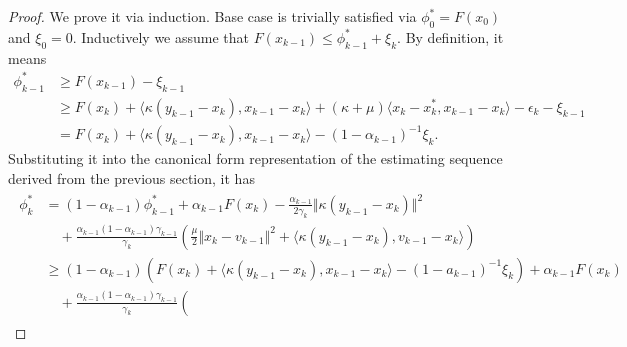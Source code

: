 \documentclass[12pt]{article}
\begin{document}
        \begin{proof}
            We prove it via induction. 
            Base case is trivially satisfied via $\phi_0^* = F(x_0)$ and $\xi_0 = 0$. 
            Inductively we assume that $F(x_{k - 1}) \le \phi_{k - 1}^* + \xi_k$. 
            By definition, it means 
            \begin{align}
                \phi_{k - 1}^* &\ge 
                F(x_{k - 1}) - \xi_{k - 1} 
                \nonumber
                \\
                &\ge 
                F(x_k) + 
                \langle \kappa(y_{k - 1} - x_k), x_{k - 1} - x_k\rangle
                + 
                (\kappa + \mu)\langle x_k - x_k^*, x_{k - 1} - x_k\rangle
                - \epsilon_k - \xi_{k - 1}
                \nonumber
                \\
                &= 
                F(x_k) + 
                \langle \kappa(y_{k - 1} - x_k), x_{k - 1} - x_k\rangle
                - (1 - \alpha_{k - 1})^{-1}\xi_k. 
            \end{align}\label{app:c3-1}
            Substituting it into the canonical form representation of the estimating sequence derived from the previous section, it has 
            {\small
            \begin{align}\begin{split}
                \phi_k^* &= 
                (1 - \alpha_{k - 1})\phi_{k - 1}^* 
                + 
                \alpha_{k - 1}F(x_k)
                - 
                \frac{\alpha_{k - 1}}{2\gamma_k}
                \Vert \kappa(y_{k - 1} - x_k)\Vert^2
                \\
                &\quad 
                + \frac{\alpha_{k - 1}(1 - \alpha_{k - 1})\gamma_{k - 1}}{\gamma_k}
                \left(
                    \frac{\mu}{2}\Vert x_k - v_{k - 1}\Vert^2
                    + \langle \kappa(y_{k - 1} - x_k), v_{k - 1} - x_k\rangle
                \right)
                \\
                &\ge 
                (1 - \alpha_{k - 1})
                \left(
                    F(x_k) + 
                    \langle \kappa(y_{k - 1} - x_k), x_{k - 1} - x_k\rangle
                    - (1 - a_{k - 1})^{-1}\xi_k
                \right)
                + 
                \alpha_{k - 1}F(x_k)
                    \\
                    &\quad 
                    + 
                    \frac{\alpha_{k - 1}(1 - \alpha_{k - 1})\gamma_{k - 1}}{\gamma_k}
                    \left(

\end{split}
\end{align}}
\end{proof}
\end{document}
